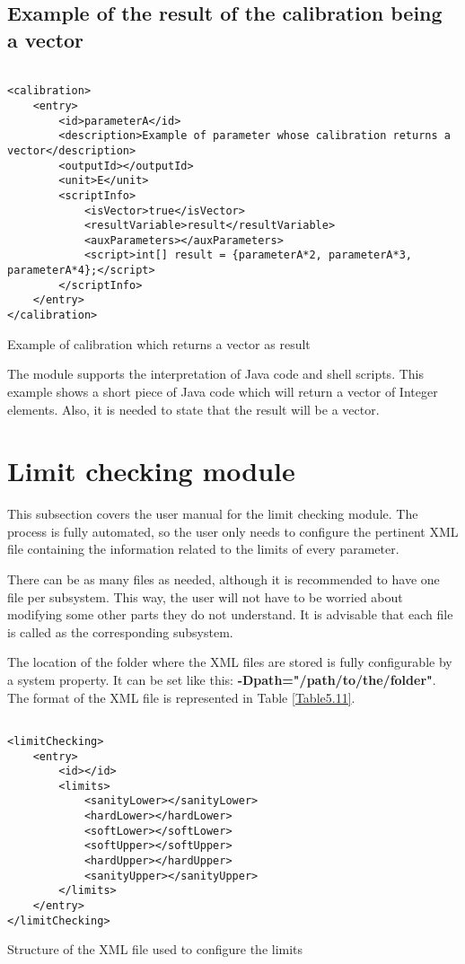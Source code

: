 \subsection{Example of the result of the calibration being a vector}

 \begin{table}[H]
\lstset{language=XML}
\begin{lstlisting}

<calibration>
	<entry>
		<id>parameterA</id>
		<description>Example of parameter whose calibration returns a vector</description>
		<outputId></outputId>
		<unit>E</unit>
		<scriptInfo>
			<isVector>true</isVector>
			<resultVariable>result</resultVariable>
			<auxParameters></auxParameters>
			<script>int[] result = {parameterA*2, parameterA*3, parameterA*4};</script>
		</scriptInfo>
	</entry>
</calibration>
\end{lstlisting}
\caption{Example of calibration which returns a vector as result} 
\label{Table5.10}
\end{table}

The module supports the interpretation of Java code and shell scripts. This example shows a short piece of Java code which will return a vector of Integer elements. Also, it is needed to state that the result will be a vector.




\section{Limit checking module}
This subsection covers the user manual for the limit checking module. The process is fully automated, so the user only needs to configure the pertinent XML file containing the information related to the limits of every parameter. 

There can be as many files as needed, although it is recommended to have one file per subsystem. This way, the user will not have to be worried about modifying some other parts they do not understand. It is advisable that each file is called as the corresponding subsystem.

The location of the folder where the XML files are stored is fully configurable by a system property. It can be set like this: \textbf{-Dpath="/path/to/the/folder"}.
\newpage
The format of the XML file is represented in Table \ref{Table5.11}.
\begin{table}[H]
\lstset{language=XML}
\begin{lstlisting}

<limitChecking>
	<entry>
		<id></id>
		<limits>
			<sanityLower></sanityLower>
			<hardLower></hardLower>
			<softLower></softLower>
			<softUpper></softUpper>
			<hardUpper></hardUpper>
			<sanityUpper></sanityUpper>
		</limits>
	</entry>
</limitChecking>
\end{lstlisting}
\caption{Structure of the XML file used to configure the limits}
\label{Table5.11}
\end{table}

